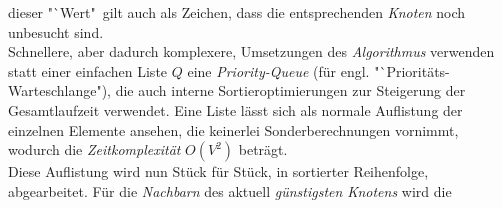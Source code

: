 \documentclass[12pt]{article}
\begin{document}
dieser "`Wert"\ gilt auch als Zeichen, dass die entsprechenden \textit{Knoten} noch unbesucht sind.
\\
Schnellere, aber dadurch komplexere, Umsetzungen des \textit{Algorithmus} verwenden statt einer einfachen Liste $Q$ eine \textit{Priority-Queue} (für engl. "`Prioritäts-Warteschlange"), die auch interne Sortieroptimierungen zur Steigerung der Gesamtlaufzeit verwendet. Eine Liste lässt sich als normale Auflistung der einzelnen Elemente ansehen, die keinerlei Sonderberechnungen vornimmt, wodurch die \textit{Zeitkomplexität} $O(V^2)$ beträgt. 
\\
Diese Auflistung wird nun Stück für Stück, in sortierter Reihenfolge, abgearbeitet. Für die \textit{Nachbarn} des aktuell \textit{günstigsten Knotens} wird die
\end{document}
